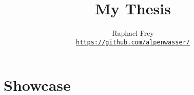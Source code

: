 \documentclass[a4paper,11pt,oneside,showtrims]{alpenthesis}
\title{My Thesis}
\author{Raphael Frey \\[1ex]\href{https://github.com/alpenwasser/}
                                 {\nolinkurl{https://github.com/alpenwasser/}}}
\begin{document}
\mainmatter
\chapter{Showcase}

\lipsum[1-2]
\end{document}
